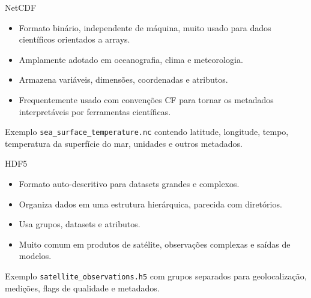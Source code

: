 \documentclass[aspectratio=169]{beamer}
\begin{document}
\begin{frame}{NetCDF}
\begin{itemize}
  \item Formato binário, independente de máquina, muito usado para dados científicos orientados a arrays.
  \item Amplamente adotado em oceanografia, clima e meteorologia.
  \item Armazena variáveis, dimensões, coordenadas e atributos.
  \item Frequentemente usado com convenções CF para tornar os metadados interpretáveis por ferramentas científicas.
\end{itemize}

\vspace{0.4cm}

\begin{block}{Exemplo}
\texttt{sea\_surface\_temperature.nc} contendo latitude, longitude, tempo, temperatura da superfície do mar, unidades e outros metadados.
\end{block}
\end{frame}

\begin{frame}{HDF5}
\begin{itemize}
  \item Formato auto-descritivo para datasets grandes e complexos.
  \item Organiza dados em uma estrutura hierárquica, parecida com diretórios.
  \item Usa grupos, datasets e atributos.
  \item Muito comum em produtos de satélite, observações complexas e saídas de modelos.
\end{itemize}

\vspace{0.4cm}

\begin{block}{Exemplo}
\texttt{satellite\_observations.h5} com grupos separados para geolocalização, medições, flags de qualidade e metadados.
\end{block}
\end{frame}
\end{document}
